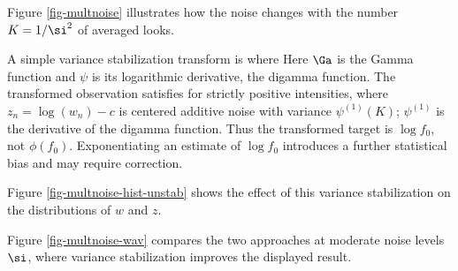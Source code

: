 
Figure \ref{fig-multnoise} illustrates how the noise changes with the number $K=1/\si^2$ of averaged looks.

A simple variance stabilization transform is
where
Here $\Ga$ is the Gamma function and $\psi$ is its logarithmic derivative, the digamma function. The transformed observation satisfies
for strictly positive intensities, where $z_n=\log(w_n)-c$ is centered additive noise with variance $\psi^{(1)}(K)$; $\psi^{(1)}$ is the derivative of the digamma function. Thus the transformed target is $\log f_0$, not $\phi(f_0)$. Exponentiating an estimate of $\log f_0$ introduces a further statistical bias and may require correction.


Figure \ref{fig-multnoise-hist-unstab} shows the effect of this variance stabilization on the distributions of $w$ and $z$.

Figure \ref{fig-multnoise-wav} compares the two approaches at moderate noise levels $\si$, where variance stabilization improves the displayed result.



